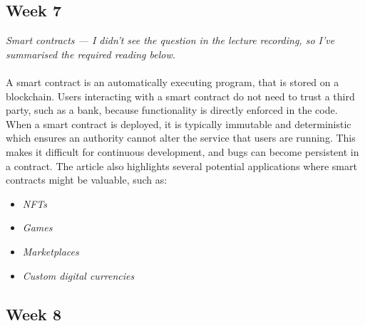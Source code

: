\documentclass{article}
\theoremstyle{definition}
\begin{document}
\subsection{Week 7}

\textit{Smart contracts --- I didn't see the question in the lecture recording, so I've summarised the required reading below.}
\\
\\
\noindent
A smart contract is an automatically executing program, that is stored on a blockchain.
Users interacting with a smart contract do not need to trust a third party, such as a bank,
because functionality is directly enforced in the code.
When a smart contract is deployed, it is typically immutable and deterministic which ensures an 
authority cannot alter the service that users are running. 
This makes it difficult for continuous development, and bugs can become persistent in a contract.
The article also highlights several potential applications where smart contracts might be valuable, such as:

\begin{itemize}
    \item \textit{NFTs}
    \item \textit{Games}
    \item \textit{Marketplaces}
    \item \textit{Custom digital currencies}
\end{itemize}

\subsection{Week 8}
\end{document}
